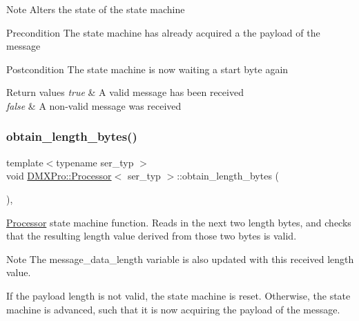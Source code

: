 \begin{DoxyNote}{Note}
Alters the state of the state machine
\end{DoxyNote}
\begin{DoxyPrecond}{Precondition}
The state machine has already acquired a the payload of the message 
\end{DoxyPrecond}
\begin{DoxyPostcond}{Postcondition}
The state machine is now waiting a start byte again
\end{DoxyPostcond}

\begin{DoxyRetVals}{Return values}
{\em true} & A valid message has been received \\
\hline
{\em false} & A non-\/valid message was received \\
\hline
\end{DoxyRetVals}
\mbox{\label{classDMXPro_1_1Processor_a229f4d96176b4fbcda52fa09e44e297a}} 
\subsubsection{\texorpdfstring{obtain\+\_\+length\+\_\+bytes()}{obtain\_length\_bytes()}}
{\footnotesize\ttfamily template$<$typename ser\+\_\+typ $>$ \\
void \hyperlink{classDMXPro_1_1Processor}{D\+M\+X\+Pro\+::\+Processor}$<$ ser\+\_\+typ $>$\+::obtain\+\_\+length\+\_\+bytes (\begin{DoxyParamCaption}{ }\end{DoxyParamCaption})\hspace{0.3cm}{\ttfamily [inline]}, {\ttfamily [private]}}



\hyperlink{classDMXPro_1_1Processor}{Processor} state machine function. Reads in the next two length bytes, and checks that the resulting length value derived from those two bytes is valid. 

\begin{DoxyNote}{Note}
The message\+\_\+data\+\_\+length variable is also updated with this received length value.
\end{DoxyNote}
If the payload length is not valid, the state machine is reset. Otherwise, the state machine is advanced, such that it is now acquiring the payload of the message.

